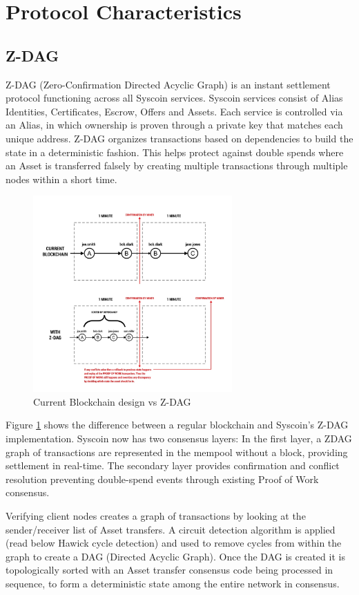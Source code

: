\documentclass[peerreview]{ieeesyscoin}
\begin{document}
\section{Protocol Characteristics}
\label{sec:protocol}

\subsection{Z-DAG}
Z-DAG (Zero-Confirmation Directed
Acyclic Graph) is an instant settlement protocol functioning
across all Syscoin services. Syscoin services consist of
Alias Identities, Certificates, Escrow, Offers and Assets.
Each service is controlled via an Alias, in which ownership
is proven through a private key that matches each
unique address. Z-DAG organizes transactions based on
dependencies to build the state in a deterministic fashion.
This helps protect against double spends where an Asset is
transferred falsely by creating multiple transactions through
multiple nodes within a short time.

\begin{figure}[h!]
\includegraphics[width=3in]{img/current_vs_zdag.png}
\caption{Current Blockchain design vs Z-DAG} 
\label{fig:current_vs_zdag}
\end{figure} 

Figure \ref{fig:current_vs_zdag}  shows the difference between a regular
blockchain and Syscoin’s Z-DAG implementation. Syscoin
now has two consensus layers: In the first layer, a ZDAG graph of transactions are represented in the mempool
without a block, providing settlement in real-time. The secondary layer provides confirmation and conflict resolution
preventing double-spend events through existing Proof of
Work consensus.

Verifying client nodes creates a graph of transactions
by looking at the sender/receiver list of Asset transfers. A
circuit detection algorithm is applied (read below Hawick
cycle detection) and used to remove cycles from within the
graph to create a DAG (Directed Acyclic Graph). Once the
DAG is created it is topologically sorted with an Asset
transfer consensus code being processed in sequence, to
form a deterministic state among the entire network in
consensus.
\end{document}
